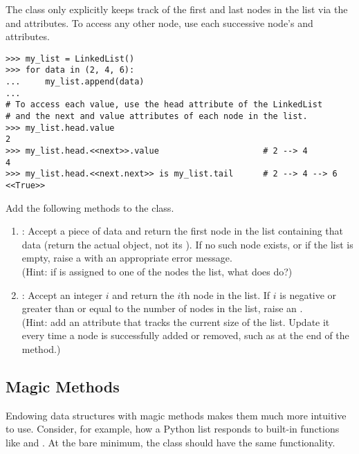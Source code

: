The  class only explicitly keeps track of the first and last nodes in the list via the  and  attributes.
To access any other node, use each successive node's  and  attributes.

\begin{lstlisting}
>>> my_list = LinkedList()
>>> for data in (2, 4, 6):
...     my_list.append(data)
...
# To access each value, use the head attribute of the LinkedList
# and the next and value attributes of each node in the list.
>>> my_list.head.value
2
>>> my_list.head.<<next>>.value                     # 2 --> 4
4
>>> my_list.head.<<next.next>> is my_list.tail      # 2 --> 4 --> 6
<<True>>
\end{lstlisting}

\begin{problem}
Add the following methods to the  class.
\begin{enumerate}
\item {}: Accept a piece of data and return the first node in the list containing that data (return the actual  object, not its ).
If no such node exists, or if the list is empty, raise a  with an appropriate error message.
\\(Hint: if  is assigned to one of the nodes the list, what does  do?)

\item {}: Accept an integer $i$ and return the $i$th node in the list.
If $i$ is negative or greater than or equal to the number of nodes in the list, raise an .
\\(Hint: add an attribute that tracks the current size of the list.
Update it every time a node is successfully added or removed, such as at the end of the  method.)
\end{enumerate}
\label{prob:linked-list-node-finders}
\end{problem}

\subsection*{Magic Methods} %

Endowing data structures with magic methods makes them much more intuitive to use.
Consider, for example, how a Python list responds to built-in functions like  and .
At the bare minimum, the  class should have the same functionality.

